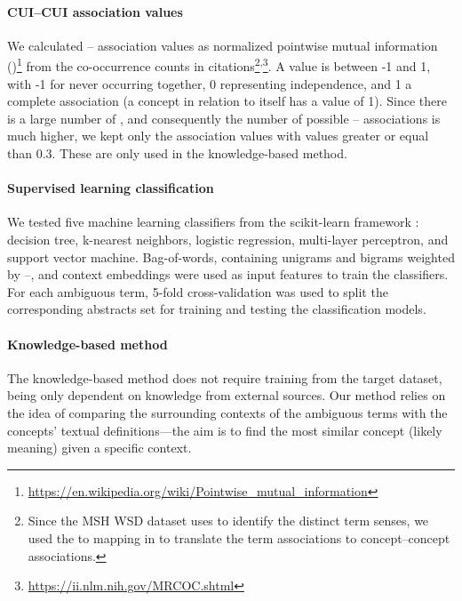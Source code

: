 \paragraph{CUI--CUI association values}

We calculated -- association values as normalized pointwise mutual information ()\footnote{\url{https://en.wikipedia.org/wiki/Pointwise_mutual_information}} from the  co-occurrence counts in  citations\footnote{Since the MSH WSD dataset uses  to identify the distinct term senses, we used the  to  mapping in  to translate the  term associations to  concept--concept associations.}\textsuperscript{,}\footnote{\url{https://ii.nlm.nih.gov/MRCOC.shtml}}.
A  value is between -1 and 1, with -1 for never occurring together, 0 representing independence, and 1 a complete association (a concept in relation to itself has a value of 1).
Since there is a large number of , and consequently the number of possible -- associations is much higher, we kept only the association values with  values greater or equal than 0.3.
These are only used in the knowledge-based method.


\paragraph{Supervised learning classification}

We tested five machine learning classifiers from the scikit-learn framework \parencite{pedregosa2011a}: decision tree, k-nearest neighbors, logistic regression, multi-layer perceptron, and support vector machine.
Bag-of-words, containing unigrams and bigrams weighted by --, and context embeddings were used as input features to train the classifiers.
For each ambiguous term, 5-fold cross-validation was used to split the corresponding abstracts set for training and testing the classification models.


\paragraph{Knowledge-based method}

The knowledge-based method does not require training from the target dataset, being only dependent on knowledge from external sources.
Our method relies on the idea of comparing the surrounding contexts of the ambiguous terms with the concepts' textual definitions---the aim is to find the most similar concept (likely meaning) given a specific context.


